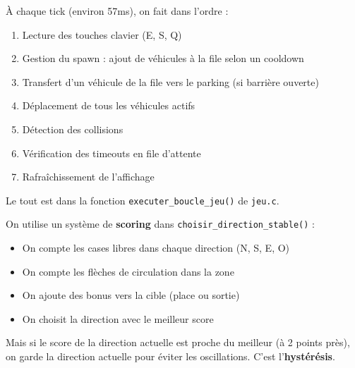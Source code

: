 \documentclass[11pt,a4paper]{article}
\newcommand{\keyword}[1]{\textcolor{primary}{\textbf{#1}}}
\newcommand{\code}[1]{\texttt{\textcolor{accent}{#1}}}
\begin{document}
\begin{reponsebox}
À chaque tick (environ 57ms), on fait dans l'ordre :
\begin{enumerate}[noitemsep, leftmargin=1.5cm]
    \item[\faIcon{keyboard}] Lecture des touches clavier (E, S, Q)
    \item[\faIcon{plus-circle}] Gestion du spawn : ajout de véhicules à la file selon un cooldown
    \item[\faIcon{door-open}] Transfert d'un véhicule de la file vers le parking (si barrière ouverte)
    \item[\faIcon{arrows-alt}] Déplacement de tous les véhicules actifs
    \item[\faIcon{car-crash}] Détection des collisions
    \item[\faIcon{hourglass-end}] Vérification des timeouts en file d'attente
    \item[\faIcon{desktop}] Rafraîchissement de l'affichage
\end{enumerate}
Le tout est dans la fonction \code{executer\_boucle\_jeu()} de \code{jeu.c}.
\end{reponsebox}

\vspace{0.3cm}

\begin{questionbox}
\end{questionbox}

\begin{reponsebox}
On utilise un système de \keyword{scoring} dans \code{choisir\_direction\_stable()} :
\begin{itemize}[noitemsep]
    \item On compte les cases libres dans chaque direction (N, S, E, O)
    \item On compte les flèches de circulation dans la zone
    \item On ajoute des bonus vers la cible (place ou sortie)
    \item On choisit la direction avec le meilleur score
\end{itemize}
Mais si le score de la direction actuelle est proche du meilleur (à 2 points près), on garde la direction actuelle pour éviter les oscillations. C'est l'\keyword{hystérésis}.
\end{reponsebox}

\vspace{0.3cm}
\end{document}
